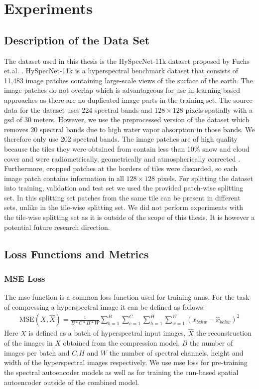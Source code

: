 \chapter{Experiments\label{cha:chapter5}}

\section{Description of the Data Set\label{sec:dataset}}
The dataset used in this thesis is the HySpecNet-11k dataset proposed by Fuchs et.al. \citep{fuchs_hyspecnet-11k_2023}. HySpecNet-11k is a hyperspectral benchmark dataset that consists of 11,483 image patches containing large-scale views of the surface of the earth. The image patches do not overlap which is advantageous for use in learning-based approaches as there are no duplicated image parts in the training set. The source data for the dataset uses 224 spectral bands and $128\times 128$ pixels spatially with a \ac{gsd} of 30 meters. However, we use the preprocessed version of the dataset which removes 20 spectral bands due to high water vapor absorption in those bands. We therefore only use 202 spectral bands. The image patches are of high quality because the tiles they were obtained from contain less than 10\% snow and cloud cover and were radiometrically, geometrically and atmospherically corrected \citep{fuchs_hyspecnet-11k_2023}. Furthermore, cropped patches at the borders of tiles were discarded, so each image patch contains information in all $128\times 128$ pixels. For splitting the dataset into training, validation and test set we used the provided patch-wise splitting set. In this splitting set patches from the same tile can be present in different sets, unlike in the tile-wise splitting set. We did not perform experiments with the tile-wise splitting set as it is outside of the scope of this thesis. It is however a potential future research direction.

\section{Loss Functions and Metrics}

\subsection{MSE Loss}
The \ac{mse} function is a common loss function used for training \acp{ann}. For the task of compressing a hyperspectral image it can be defined as follows:
\begin{align}
\text{MSE}(X,\hat{X}) = \frac{1}{B*C*H*W} \sum_{b=1}^{B}\sum_{c=1}^{C}\sum_{h=1}^H\sum_{w=1}^W (x_{bchw} - \hat{x}_{bchw})^2
\end{align}
Here $X$ is defined as a batch of hyperspectral input images, $\hat{X}$ the reconstruction of the images in $X$ obtained from the compression model, $B$ the number of images per batch and $C$,$H$ and $W$ the number of spectral channels, height and width of the hyperspectral images respectively.
We use \ac{mse} loss for pre-training the spectral autoencoder models as well as for training the \ac{cnn}-based spatial autoencoder outside of the combined model.

